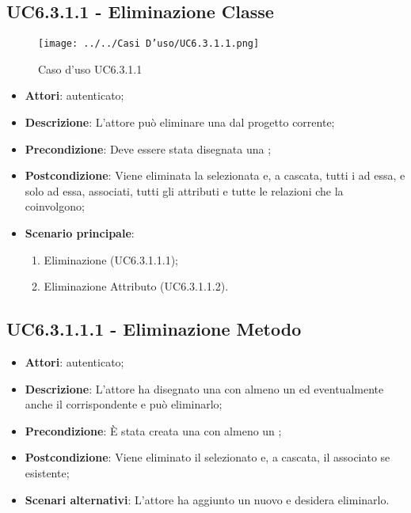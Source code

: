 \subsection{UC6.3.1.1 - Eliminazione Classe}
\label{ssec:UC6.3.1.1}
\begin{figure}[h!]
\centering
\texttt{[image: ../../Casi D'uso/UC6.3.1.1.png]}
\caption{Caso d'uso UC6.3.1.1}
 \end{figure}
\begin{itemize}
\item \textbf{Attori}:  autenticato;
\item \textbf{Descrizione}: L'attore può eliminare una  dal progetto corrente;
\item \textbf{Precondizione}: Deve essere stata disegnata una ;
\item \textbf{Postcondizione}: Viene eliminata la  selezionata e, a cascata, tutti i  ad essa, e solo ad essa, associati, tutti gli attributi e tutte le relazioni che la coinvolgono;
\item \textbf{Scenario principale}: \begin{enumerate}\item Eliminazione  (UC6.3.1.1.1);\item Eliminazione Attributo (UC6.3.1.1.2).
 \end{enumerate}
\end{itemize}
\subsection{UC6.3.1.1.1 - Eliminazione Metodo}
\label{ssec:UC6.3.1.1.1}
\begin{itemize}
\item \textbf{Attori}:  autenticato;
\item \textbf{Descrizione}: L'attore ha disegnato una  con almeno un  ed  eventualmente anche il  corrispondente e può eliminarlo;
\item \textbf{Precondizione}: È stata creata una  con almeno un ;
\item \textbf{Postcondizione}: Viene eliminato il  selezionato e, a cascata, il  associato se esistente;
\item \textbf{Scenari alternativi}: L'attore ha aggiunto un nuovo  e desidera eliminarlo.
\end{itemize}
